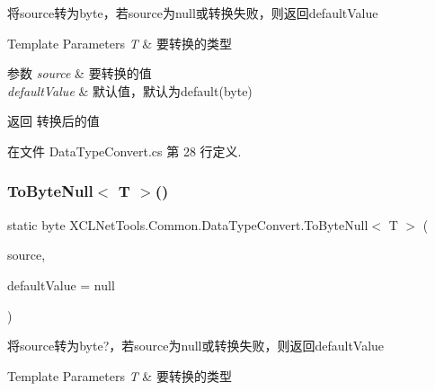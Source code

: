 将source转为byte，若source为null或转换失败，则返回default\+Value 


\begin{DoxyTemplParams}{Template Parameters}
{\em T} & 要转换的类型\\
\hline
\end{DoxyTemplParams}

\begin{DoxyParams}{参数}
{\em source} & 要转换的值\\
\hline
{\em default\+Value} & 默认值，默认为default(byte)\\
\hline
\end{DoxyParams}
\begin{DoxyReturn}{返回}
转换后的值
\end{DoxyReturn}


在文件 Data\+Type\+Convert.\+cs 第 28 行定义.

\mbox{\label{class_x_c_l_net_tools_1_1_common_1_1_data_type_convert_a31ffdc90ba73c781425142b98c8ea1d5}} 
\subsubsection{\texorpdfstring{To\+Byte\+Null$<$ T $>$()}{ToByteNull< T >()}}
{\footnotesize\ttfamily static byte X\+C\+L\+Net\+Tools.\+Common.\+Data\+Type\+Convert.\+To\+Byte\+Null$<$ T $>$ (\begin{DoxyParamCaption}\item[{T}]{source,  }\item[{byte?}]{default\+Value = {\ttfamily null} }\end{DoxyParamCaption})\hspace{0.3cm}{\ttfamily [static]}}



将source转为byte?，若source为null或转换失败，则返回default\+Value 


\begin{DoxyTemplParams}{Template Parameters}
{\em T} & 要转换的类型\\
\hline
\end{DoxyTemplParams}

